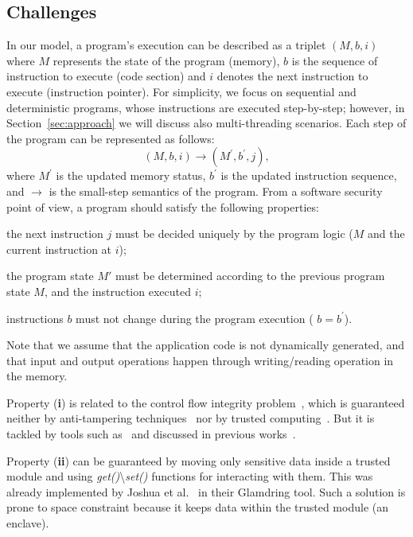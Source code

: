 \subsection{Challenges}
\label{ssect:design-theory}
In our model, a program's execution can be described as a triplet $(M,b,i)$ 
where $M$ represents the state of the program (\ie memory), $b$ is the sequence 
of instruction to execute (\ie code section) and $i$ denotes the next 
instruction to execute (\ie instruction pointer).
For simplicity, we focus on sequential and deterministic programs, whose 
instructions are executed step-by-step; however, in Section~\ref{sec:approach} 
we will discuss also multi-threading scenarios.
Each step of the program can be represented as follows:
\[ (M,b,i) \rightarrow (M^\prime,b^\prime,j), \]
where $M^\prime$ is the updated memory status, $b^\prime$ is the updated 
instruction sequence, and $\rightarrow$ is the small-step semantics of the 
program.
From a software security point of view, a program should satisfy the following 
properties:
\begin{enumerate*}[label=(\textbf{\roman*})]
	\item the next instruction $j$ must be decided uniquely by the program 
	logic (\ie $M$ and the current instruction at $i$);
	\item the program state $M'$ must be determined according to the previous 
	program state $M$, and the instruction executed $i$; %
	\item instructions $b$ must not change during the program execution (\ie 
	$b=b^\prime$).
\end{enumerate*}
Note that we assume that the application code is not dynamically generated, and 
that input and output operations happen through writing/reading operation in 
the memory.

Property (\textbf{i}) is related to the control flow integrity 
problem~\cite{8269390}, which is guaranteed neither by anti-tampering 
techniques~\cite{nagra2009surreptitious} nor by trusted 
computing~\cite{lee2017hacking}.
But it is tackled by tools such as~\cite{microsoftcfg,tice2014enforcing} and 
discussed in previous 
works~\cite{onarlioglu2010g,wang2010hypersafe,abadi2005control,zhang2013control,davi2014stitching}.

Property (\textbf{ii}) can be guaranteed by moving only sensitive data inside a 
trusted module and using \emph{get()}\textbackslash{}\emph{set()} functions for 
interacting with them.
This was already implemented by Joshua et al.~\cite{lind2017glamdring} in their 
Glamdring tool.
Such a solution is prone to space constraint because it keeps data within the 
trusted module (\ie an enclave).

